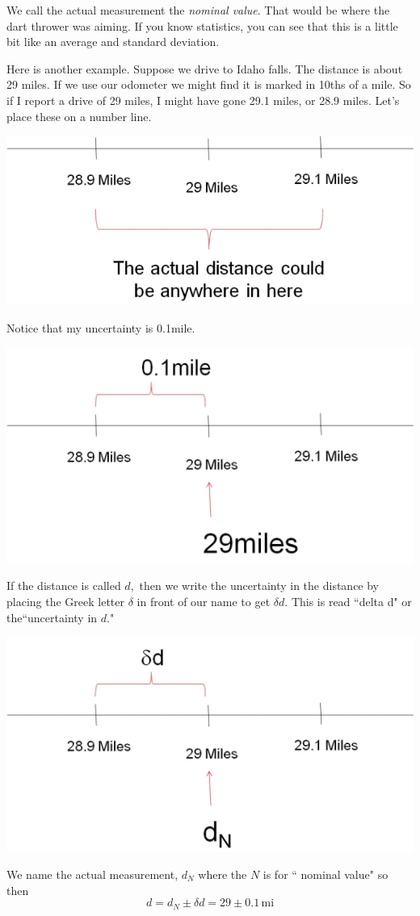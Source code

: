 \documentclass[twoside,11pt,ShortChapTitles]{BYUTextbook}
\begin{document}
 We call the actual measurement the \emph{nominal value}. That would be where
the dart thrower was aiming. If you know statistics, you can see that this is
a little bit like an average and standard deviation.

Here is another example. Suppose we drive to Idaho falls. The distance is
about 29 miles. If we use our odometer we might find it is marked in 10ths of
a mile. So if I report a drive of 29 miles, I might have gone 29.1 miles, or
28.9 miles. Let's place these on a number line.
\begin{center}
\includegraphics[width=\textwidth]{Lab1_Figs/old_images-003.png}\end{center}
 Notice that my uncertainty is 0.1mile.
\begin{center}
\includegraphics[width=\textwidth]{Lab1_Figs/old_images-004.png}\end{center}
 If the distance is called $d,$ then we write the uncertainty in the distance
by placing the Greek letter $\delta$ in front of our name to get $\delta d.$
This is read ``delta d" or the``uncertainty in $d.$"
\begin{center}
\includegraphics[width=\textwidth]{Lab1_Figs/old_images-005.png}\end{center}
 We name the actual measurement, $d_{N}$ where the $N$ is for ``
nominal value" so then
\[d =d_{N}\pm\delta d=29\pm0.1\,\text{mi} \]
\end{document}
